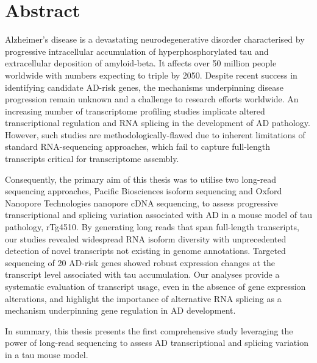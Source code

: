 \chapter*{Abstract}

Alzheimer's disease is a devastating neurodegenerative disorder characterised by progressive intracellular accumulation of hyperphosphorylated tau and extracellular deposition of amyloid-beta. It affects over 50 million people worldwide with numbers expecting to triple by 2050. Despite recent success in identifying candidate AD-risk genes, the mechanisms underpinning disease progression remain unknown and a challenge to research efforts worldwide. An increasing number of transcriptome profiling studies implicate altered transcriptional regulation and RNA splicing in the development of AD pathology. However, such studies are methodologically-flawed due to inherent limitations of standard RNA-sequencing approaches, which fail to capture full-length transcripts critical for transcriptome assembly.  

Consequently, the primary aim of this thesis was to utilise two long-read sequencing approaches, Pacific Biosciences isoform sequencing and Oxford Nanopore Technologies nanopore cDNA sequencing, to assess progressive transcriptional and splicing variation associated with AD in a mouse model of tau pathology, rTg4510. By generating long reads that span full-length transcripts, our studies revealed widespread RNA isoform diversity with unprecedented detection of novel transcripts not existing in genome annotations. Targeted sequencing of 20 AD-risk genes showed robust expression changes at the transcript level associated with tau accumulation. Our analyses provide a systematic evaluation of transcript usage, even in the absence of gene expression alterations, and highlight the importance of alternative RNA splicing as a mechanism underpinning gene regulation in AD development. 

In summary, this thesis presents the first comprehensive study leveraging the power of long-read sequencing to assess AD transcriptional and splicing variation in a tau mouse model.       